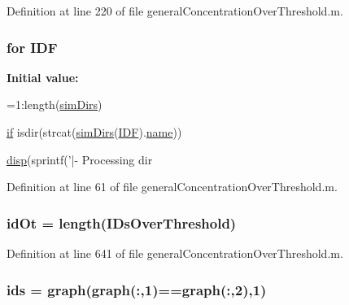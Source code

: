 Definition at line 220 of file general\-Concentration\-Over\-Threshold.\-m.

\hypertarget{a00028_a8acdc1bee73718b1ffcfc7eb26968f48}{
\subsubsection[{I\-D\-F}]{\setlength{\rightskip}{0pt plus 5cm}for I\-D\-F}}\label{a00028_a8acdc1bee73718b1ffcfc7eb26968f48}
{\bfseries Initial value\-:}
\begin{DoxyCode}
=1:length(\hyperlink{a00027_aae5035eb84b89176ed5b06e136325eff}{simDirs})
    
    \hyperlink{a00025_adf3394dfd4755fd0ef2854fe558ff8aa}{if} isdir(strcat(\hyperlink{a00027_aae5035eb84b89176ed5b06e136325eff}{simDirs}(\hyperlink{a00028_a8acdc1bee73718b1ffcfc7eb26968f48}{IDF}).\hyperlink{a00027_abbf559a76fab59203496b0847ab9502a}{name}))
        
        \hyperlink{a00023_a9be64ccaf83f215ee184d5aafefd7352}{disp}(sprintf('|- Processing dir %
\end{DoxyCode}


Definition at line 61 of file general\-Concentration\-Over\-Threshold.\-m.

\hypertarget{a00028_ad5352b3d09cda91b8c5f90532900abeb}{
\subsubsection[{id\-Ot}]{\setlength{\rightskip}{0pt plus 5cm}id\-Ot = length({\bf I\-Ds\-Over\-Threshold})}}\label{a00028_ad5352b3d09cda91b8c5f90532900abeb}


Definition at line 641 of file general\-Concentration\-Over\-Threshold.\-m.

\hypertarget{a00028_a0a9b879f29cc1e1e03ffc7851f7c19b9}{
\subsubsection[{ids}]{\setlength{\rightskip}{0pt plus 5cm}ids = {\bf graph}({\bf graph}(\-:,1)=={\bf graph}(\-:,2),1)}}\label{a00028_a0a9b879f29cc1e1e03ffc7851f7c19b9}


